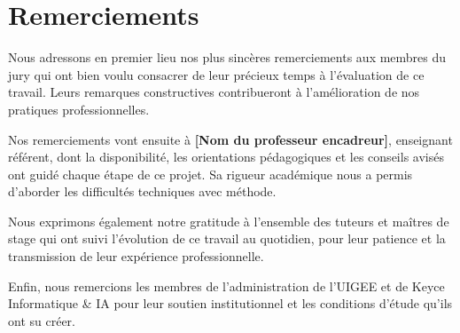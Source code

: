 \documentclass[12pt, a4paper, oneside]{report}
\begin{document}
\setcounter{page}{1}

\clearpage
{
  \renewcommand{\contentsname}{Sommaire}
  \localtableofcontents*
}

\chapter*{Remerciements}

Nous adressons en premier lieu nos plus sincères remerciements aux membres du jury qui ont
bien voulu consacrer de leur précieux temps à l'évaluation de ce travail. Leurs remarques
constructives contribueront à l'amélioration de nos pratiques professionnelles.

Nos remerciements vont ensuite à \textbf{[Nom du professeur encadreur]}, enseignant
référent, dont la disponibilité, les orientations pédagogiques et les conseils avisés ont
guidé chaque étape de ce projet. Sa rigueur académique nous a permis d'aborder les
difficultés techniques avec méthode.

Nous exprimons également notre gratitude à l'ensemble des tuteurs et maîtres de stage qui
ont suivi l'évolution de ce travail au quotidien, pour leur patience et la transmission
de leur expérience professionnelle.

Enfin, nous remercions les membres de l'administration de l'UIGEE et de Keyce Informatique
\& IA pour leur soutien institutionnel et les conditions d'étude qu'ils ont su créer.

\end{document}
